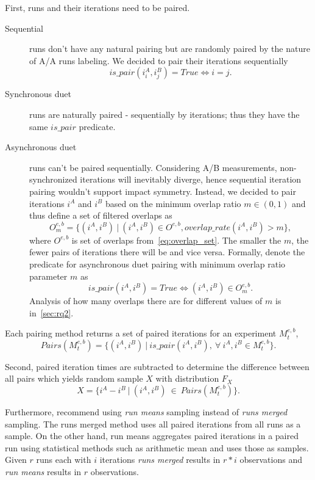 First, runs and their iterations need to be paired.
\begin{description}
    \item[Sequential] runs don't have any natural pairing but are randomly paired by the nature of A/A runs labeling. We decided to pair their iterations sequentially
        $$
        is\_pair(i^A_i, i^B_j) = True \Longleftrightarrow i = j.
        $$
    \item[Synchronous duet] runs are naturally paired - sequentially by iterations; thus they have the same $is\_pair$ predicate.
    \item[Asynchronous duet] runs can't be paired sequentially.
        Considering A/B measurements, non-synchronized iterations will inevitably diverge, hence sequential iteration pairing wouldn't support impact symmetry.
        Instead, we decided to pair iterations $i^A$ and $i^B$ based on the minimum overlap ratio $m \in (0, 1)$ and thus define a set of filtered overlaps as
        \begin{equation}\label{eq:overlap_set_filtered}
        O^{e,b}_m = \{(i^A, i^B)~|~(i^A, i^B) \in O^{e, b}, overlap\_rate(i^A, i^B) > m\},
        \end{equation}
        where $O^{e, b}$ is set of overlaps from~\cref{eq:overlap_set}.
        The smaller the $m$, the fewer pairs of iterations there will be and vice versa.
        Formally, denote the predicate for asynchronous duet pairing with minimum overlap ratio parameter $m$ as
        $$
        is\_pair(i^A, i^B) = True \Longleftrightarrow (i^A, i^B) \in O^{e,b}_m.
        $$
        Analysis of how many overlaps there are for different values of $m$ is in~\cref{sec:rq2}.
\end{description}
Each pairing method returns a set of paired iterations for an experiment $M^{e, b}_t$,
$$
Pairs(M^{e, b}_t) = \{(i^A, i^B)~|~is\_pair(i^A, i^B),~\forall~i^A, i^B \in M^{e, b}_t\}.
$$

Second, paired iteration times are subtracted to determine the difference between all pairs which yields random sample $X$ with distribution $F_X$
$$
X = \{i^A - i^B~|~(i^A, i^B)~\in~Pairs(M^{e, b}_t)\}.
$$

Furthermore, \citet{bulej2017stat} recommend using \emph{run means} sampling instead of \emph{runs merged} sampling.
The runs merged method uses all paired iterations from all runs as a sample.
On the other hand, run means aggregates paired iterations in a paired run using statistical methods such as arithmetic mean and uses those as samples.
Given $r$ runs each with $i$ iterations \emph{runs merged} results in $r * i$ observations and \emph{run means} results in $r$ observations.

